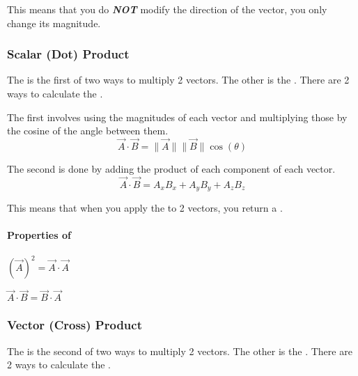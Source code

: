 This means that you do \emph{\textbf{NOT}} modify the direction of the vector, you only change its magnitude.

\subsubsection{Scalar (Dot) Product}\label{subsubsec:Dot Product}
The  is the first of two ways to multiply 2 vectors.
The other is the .
There are 2 ways to calculate the .

The first involves using the magnitudes of each vector and multiplying those by the cosine of the angle between them.
\begin{equation}\label{eq:Dot Product Magnitudes}
  \vec{A} \cdot \vec{B} = \lVert \vec{A} \rVert \lVert \vec{B} \rVert \cos \left( \theta \right)
\end{equation}

The second is done by adding the product of each component of each vector.
\begin{equation}\label{eq:Dot Product Components}
  \vec{A} \cdot \vec{B} = A_{x}B_{x} + A_{y}B_{y} + A_{z}B_{z}
\end{equation}

\begin{remark*}
  This means that when you apply the  to 2 vectors, you return a .
\end{remark*}

\paragraph{Properties of }\label{par:Dot Product Properties}
\begin{propertylist}
  \item $( \vec{A} )^{2} = \vec{A} \cdot \vec{A}$
  \item $\vec{A} \cdot \vec{B} = \vec{B} \cdot \vec{A}$
\end{propertylist}

\subsubsection{Vector (Cross) Product}\label{subsubsec:Cross Product}
The  is the second of two ways to multiply 2 vectors.
The other is the .
There are 2 ways to calculate the .

